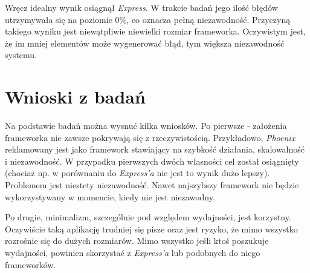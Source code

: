 Wręcz idealny wynik osiągnął \emph{Express}. W trakcie badań jego ilość błędów utrzymywała się na poziomie $0\%$, co oznacza pełną niezawodność. Przyczyną takiego wyniku jest niewątpliwie niewielki rozmiar frameworka. Oczywistym jest, że im mniej elementów może wygenerować błąd, tym większa niezawodność systemu.

\section{Wnioski z badań}
Na podstawie badań można wysnuć kilka wniosków. Po pierwsze - założenia frameworka nie zawsze pokrywają się z rzeczywistością. Przykładowo, \emph{Phoenix} reklamowany jest jako framework stawiający na szybkość działania, skalowalność i niezawodność. W przypadku pierwszych dwóch własności cel został osiągnięty (chociaż np. w porównaniu do \emph{Express'a} nie jest to wynik dużo lepszy). Problemem jest niestety niezawodność. Nawet najszybszy framework nie będzie wykorzystywany w momencie, kiedy nie jest niezawodny.

Po drugie, minimalizm, szczególnie pod względem wydajności, jest korzystny. Oczywiście taką aplikację trudniej się pisze oraz jest ryzyko, że mimo wszystko rozrośnie się do dużych rozmiarów. Mimo wszystko jeśli ktoś poszukuje wydajności, powinien skorzystać z \emph{Express'a} lub podobnych do niego frameworków.
